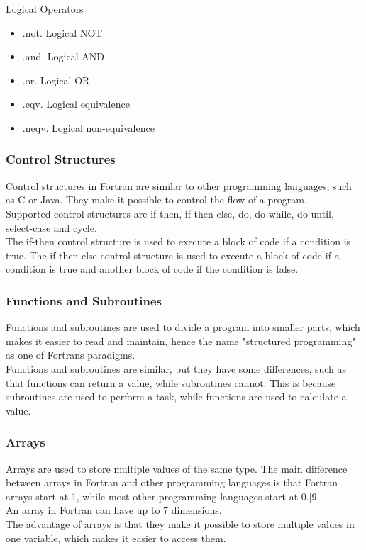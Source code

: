 \documentclass[11pt,a4paper]{scrartcl}
\begin{document}
\begin{center}
Logical Operators
\begin{itemize}
\item .not. Logical NOT
\item .and. Logical AND
\item .or. Logical OR
\item .eqv. Logical equivalence
\item .neqv. Logical non-equivalence
\end{itemize}

\subsubsection{Control Structures}
Control structures in Fortran are similar to other programming languages, such as C or Java. They make it possible to control the flow of a program.\\
Supported control structures are if-then, if-then-else, do, do-while, do-until, select-case and cycle.\\
The if-then control structure is used to execute a block of code if a condition is true. The if-then-else control structure is used to execute a block of code if a condition is true and another block of code if the condition is false.

\subsubsection{Functions and Subroutines}
Functions and subroutines are used to divide a program into smaller parts, which makes it easier to read and maintain, hence the name "structured programming" as one of Fortrans paradigms.\\
Functions and subroutines are similar, but they have some differences, such as that functions can return a value, while subroutines cannot. This is because subroutines are used to perform a task, while functions are used to calculate a value.\\

\subsubsection{Arrays}
Arrays are used to store multiple values of the same type. The main difference between arrays in Fortran and other programming languages is that Fortran arrays start at 1, while most other programming languages start at 0.[9]\\
An array in Fortran can have up to 7 dimensions.\\
The advantage of arrays is that they make it possible to store multiple values in one variable, which makes it easier to access them.\\


\end{center}
\end{document}
